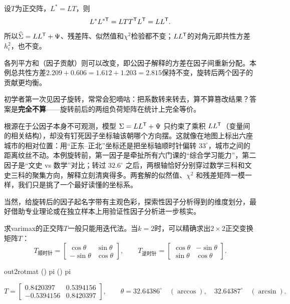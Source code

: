\begin{zm}[旋转不改变拟合]
设$T$为正交阵，$L^*=LT$，则
\[
L^*L^{*\mathsf T}=LTT^{\mathsf T} L^{\mathsf T}=LL^{\mathsf T}.
\]
所以$\widehat\Sigma=LL^{\mathsf T}+\Psi$、残差阵、似然值和$\chi^2$检验都不变；$LL^{\mathsf T}$的对角元即共性方差$h_i^2$，也不变。
\end{zm}
各列平方和（因子贡献）则可以改变，即公因子解释的方差在因子间重新分配。本例总共性方差$2.209+0.606=1.612+1.203=2.815$保持不变，旋转后两个因子的贡献更均衡。

\begin{sikao}
初学者第一次见因子旋转，常常会犯嘀咕：把系数转来转去，算不算篡改结果？答案是\textbf{完全不算}——旋转前后的两组负荷矩阵在统计上完全等价。

根源在于公因子本身不可观测，模型 $\Sigma=LL^{\mathsf T}+\Psi$ 只约束了乘积 $LL^{\mathsf T}$（变量间的相关结构），却没有钉死因子坐标轴该朝哪个方向摆。这就像在地图上标出六座城市的相对位置：用“正东--正北”坐标还是把坐标轴顺时针偏转 $33^\circ$，城市之间的距离纹丝不动。本例旋转前，第一因子是牵扯所有六门课的“综合学习能力”，第二因子是“文史 vs 数学”对比；转过 $32.6^\circ$ 之后，两根轴恰好分别穿过数学三科和文史三科的聚集方向，解释立刻清爽得多。两套解的似然值、$\chi^2$ 和残差矩阵一模一样，我们只是挑了一个最好读懂的坐标系。

当然，给旋转后的因子起名字带有主观色彩，探索性因子分析得到的维度划分，最好借助专业理论或在独立样本上用验证性因子分析进一步核实。
\end{sikao}
求varimax的正交阵$T$一般只能用迭代法。当$k=2$时，可以精确求出$2\times2$正交变换矩阵$T$：
\[
T_{\text{顺时针}}=\begin{bmatrix}\cos\theta&\sin\theta\\-\sin\theta&\cos\theta\end{bmatrix},\qquad
T_{\text{逆时针}}=\begin{bmatrix}\cos\theta&-\sin\theta\\\sin\theta&\cos\theta\end{bmatrix}.
\]
\begin{code}
out2\ROperator{\$}rotmat
() \ROperator{/} pi \ROperator{*} 
() \ROperator{/} pi \ROperator{*} 
\end{code}
\[
T=\begin{bmatrix}0.8420397&0.5394156\\-0.5394156&0.8420397\end{bmatrix},\qquad
\theta=32.64386^\circ\quad(\arccos),\quad32.64387^\circ\quad(\arcsin).
\]
